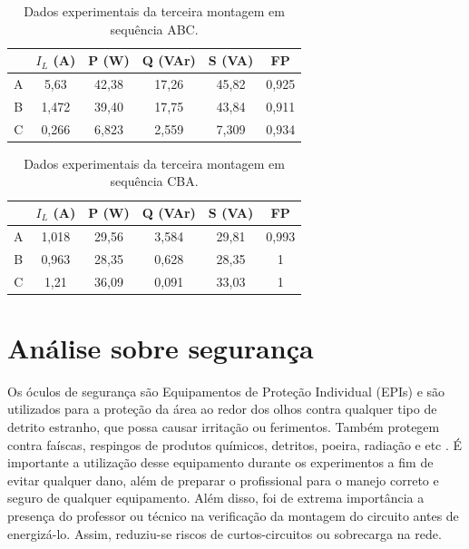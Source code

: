 \documentclass[a4paper,12pt,oneside,openany,table,xcdraw]{article}
\begin{document}
\begin{table}[H]
\centering \small {}
\caption{Dados experimentais da terceira montagem em sequência ABC.}
\label{m3:dados:abc}
\begin{tabular}{c|c|c|c|c|c|}
\cline{2-6}
                        & $I_L$ (A) & P (W) & Q (VAr) & S (VA) & FP    \\ \hline
\multicolumn{1}{|c|}{A} & 5,63      & 42,38 & 17,26   & 45,82  & 0,925 \\ \hline
\multicolumn{1}{|c|}{B} & 1,472     & 39,40 & 17,75   & 43,84  & 0,911 \\ \hline
\multicolumn{1}{|c|}{C} & 0,266     & 6,823 & 2,559   & 7,309  & 0,934 \\ \hline
\end{tabular}
\end{table}

\begin{table}[H]
\centering \small {}
\caption{Dados experimentais da terceira montagem em sequência CBA.}
\label{m3:dados:cba}
\begin{tabular}{c|c|c|c|c|c|}
\cline{2-6}
 & $I_L$ (A) & P (W) & Q (VAr) & S (VA) & FP \\ \hline
\multicolumn{1}{|c|}{A} & 1,018 & 29,56 & 3,584 & 29,81 & 0,993 \\ \hline
\multicolumn{1}{|c|}{B} & 0,963 & 28,35 & 0,628 & 28,35 & 1 \\ \hline
\multicolumn{1}{|c|}{C} & 1,21 & 36,09 & 0,091 & 33,03 & 1 \\ \hline
\end{tabular}
\end{table}


\section{Análise sobre segurança} %
Os óculos de segurança são Equipamentos de Proteção Individual (EPIs) e são utilizados para a proteção da área ao redor dos olhos contra qualquer tipo de detrito estranho, que possa causar irritação ou ferimentos. Também protegem contra faíscas, respingos de produtos químicos, detritos, poeira, radiação e etc \cite{safe}.
É importante a utilização desse equipamento durante os experimentos a fim de evitar qualquer dano, além de preparar o profissional para o manejo correto e seguro de qualquer equipamento.
Além disso, foi de extrema importância a presença do professor ou técnico na verificação da montagem do circuito antes de energizá-lo. Assim, reduziu-se riscos de curtos-circuitos ou sobrecarga na rede.
\end{document}
